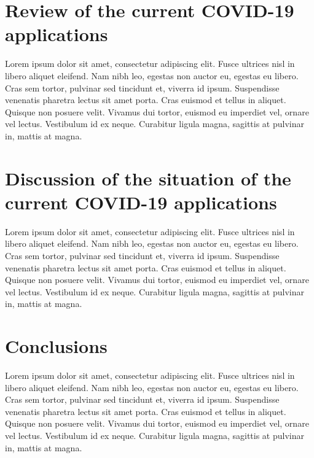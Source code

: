 \documentclass[a4paper, 12pt]{article}
\begin{document}

\section{Review of the current COVID-19 applications}
\label{section:review}

Lorem ipsum dolor sit amet, consectetur adipiscing elit. Fusce ultrices nisl in libero aliquet eleifend. Nam nibh leo, egestas non auctor eu, egestas eu libero. Cras sem tortor, pulvinar sed tincidunt et, viverra id ipsum. Suspendisse venenatis pharetra lectus sit amet porta. Cras euismod et tellus in aliquet. Quisque non posuere velit. Vivamus dui tortor, euismod eu imperdiet vel, ornare vel lectus. Vestibulum id ex neque. Curabitur ligula magna, sagittis at pulvinar in, mattis at magna.


\section{Discussion of the situation of the current COVID-19 applications}
\label{section:discussion}

Lorem ipsum dolor sit amet, consectetur adipiscing elit. Fusce ultrices nisl in libero aliquet eleifend. Nam nibh leo, egestas non auctor eu, egestas eu libero. Cras sem tortor, pulvinar sed tincidunt et, viverra id ipsum. Suspendisse venenatis pharetra lectus sit amet porta. Cras euismod et tellus in aliquet. Quisque non posuere velit. Vivamus dui tortor, euismod eu imperdiet vel, ornare vel lectus. Vestibulum id ex neque. Curabitur ligula magna, sagittis at pulvinar in, mattis at magna.


\section{Conclusions}
\label{section:conclusions}

Lorem ipsum dolor sit amet, consectetur adipiscing elit. Fusce ultrices nisl in libero aliquet eleifend. Nam nibh leo, egestas non auctor eu, egestas eu libero. Cras sem tortor, pulvinar sed tincidunt et, viverra id ipsum. Suspendisse venenatis pharetra lectus sit amet porta. Cras euismod et tellus in aliquet. Quisque non posuere velit. Vivamus dui tortor, euismod eu imperdiet vel, ornare vel lectus. Vestibulum id ex neque. Curabitur ligula magna, sagittis at pulvinar in, mattis at magna.






\nocite{*}
\end{document}
